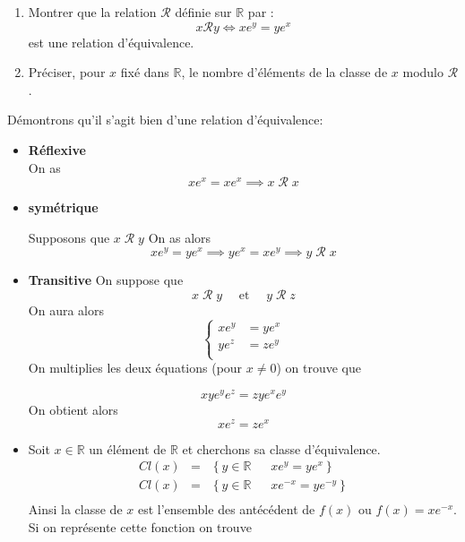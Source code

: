 \documentclass{report}
\begin{document}
\qs{}
{
\begin{enumerate}
  \item
    Montrer que la relation $\mathcal{R}$ d\'{e}finie sur $\mathbb{R}$ par :
$$x\mathcal{R} y\Longleftrightarrow xe^{y}=ye^{x}$$
est une relation d'\'{e}quivalence.
\item
  Pr\'{e}ciser, pour $x$ fix\'{e} dans $\mathbb{R}$, le nombre d'\'{e}l\'{e}ments de
la classe de $x$ modulo $\mathcal{R}$.
\end{enumerate}
}
\begin{myproof}
Démontrons qu'il s'agit bien d'une relation d'équivalence:  

\begin{itemize}
  \item \textbf{Réflexive}\\
    On as 
    $$
    x e^x = x e^x \implies x\;\mathcal{R}\; x
    $$
  \item \textbf{symétrique}

    Supposons que $x \;\mathcal{R}\; y$ On as alors
    $$ xe^y = y e^x \implies ye^x
    = xe^y \implies y \;\mathcal{R}\; x
    $$
  \item \textbf{Transitive}
    On suppose que 
    $$
    x\;\mathcal{R}\; y \quad \text{ et } \quad y \;\mathcal{R}\; z
    $$
    On aura alors
    $$
    \begin{cases}
      xe^y &= ye^x   \\[2pt]
      ye^z &= ze^y   \\[2pt]
    \end{cases}
    $$
    On multiplies les deux équations (pour $x\ne0$)
    on trouve que 

    $$
    xye^ye^z = zy e^xe^y
    $$
    On obtient alors
    $$
    xe^z = ze^x
    $$
\item Soit $x\in \mathbb{R}$ un élément de $\mathbb{R}$ et cherchons sa classe
  d'équivalence.
  \begin{eqnarray}
    Cl(x) & = &\left\{ y \in \mathbb{R}\;\quad \; xe^y = ye^x\right\}\\
    Cl(x) & = &\left\{ y \in \mathbb{R}\;\quad \; xe^{-x} = ye^{-y}\right\}\\
  \end{eqnarray}
  Ainsi la classe de $x$ est l'ensemble des antécédent de $f(x)$ ou $f(x) =
  xe^{-x}$. Si on représente cette fonction on trouve


\end{itemize}
\end{myproof}
\end{document}
